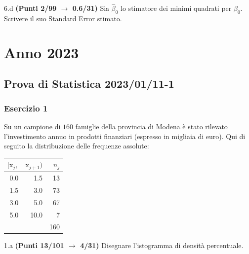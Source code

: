 \documentclass[
  11pt,
]{book}
\theoremstyle{mytheoremstyle}
\theoremstyle{mydefstyle}
\begin{document}
6.d \textbf{(Punti 2/99 \(\rightarrow\) 0.6/31)} Sia \(\hat\beta_0\) lo stimatore dei minimi quadrati per \(\beta_0\).
Scrivere il suo Standard Error stimato.

\chapter{Anno 2023}\label{anno-2023}

\section{Prova di Statistica 2023/01/11-1}\label{prova-di-statistica-20230111-1}

\subsection{Esercizio 1}\label{esercizio-1-19}

Su un campione di \(160\) famiglie della provincia di Modena è stato rilevato l'investimento annuo in prodotti finanziari (espresso in migliaia di euro). Qui di seguito la distribuzione delle frequenze assolute:

\begin{table}[H]
\centering
\begin{tabular}{rrr}
\toprule
$[\text{x}_j,$ & $\text{x}_{j+1})$ & $n_j$\\
\midrule
0.0 & 1.5 & 13\\
1.5 & 3.0 & 73\\
3.0 & 5.0 & 67\\
5.0 & 10.0 & 7\\
 &  & 160\\
\bottomrule
\end{tabular}
\end{table}

1.a \textbf{(Punti 13/101 \(\rightarrow\) 4/31)} Disegnare l'istogramma di densità percentuale.
\end{document}
